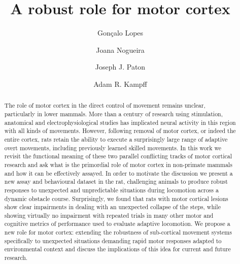 \documentclass[12pt]{article}
\title{A robust role for motor cortex}
\author{Gonçalo Lopes}
\author{Joana Nogueira}
\author{Joseph J. Paton}
\author{Adam R. Kampff}
\affil{Champalimaud Neuroscience Programme\\ Champalimaud Centre for the Unknown, Lisbon, Portugal}
\newcounter{video}
\begin{document}
\maketitle

\begin{linenumbers}
\begin{abstract}
The role of motor cortex in the direct control of movement remains unclear, particularly in lower mammals. More than a century of research using stimulation, anatomical and electrophysiological studies has implicated neural activity in this region with all kinds of movements. However, following removal of motor cortex, or indeed the entire cortex, rats retain the ability to execute a surprisingly large range of adaptive overt movements, including previously learned skilled movements. In this work we revisit the functional meaning of these two parallel conflicting tracks of motor cortical research and ask what is the primordial role of motor cortex in non-primate mammals and how it can be effectively assayed. In order to motivate the discussion we present a new assay and behavioural dataset in the rat, challenging animals to produce robust responses to unexpected and unpredictable situations during locomotion across a dynamic obstacle course. Surprisingly, we found that rats with motor cortical lesions show clear impairments in dealing with an unexpected collapse of the steps, while showing virtually no impairment with repeated trials in many other motor and cognitive metrics of performance used to evaluate adaptive locomotion. We propose a new role for motor cortex: extending the robustness of sub-cortical movement systems specifically to unexpected situations demanding rapid motor responses adapted to environmental context and discuss the implications of this idea for current and future research.
\end{abstract}








\end{linenumbers}
\printbibliography
\end{document}
